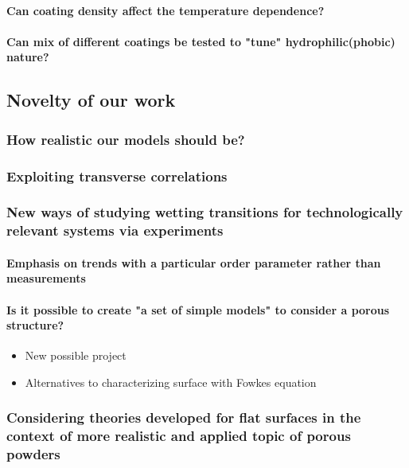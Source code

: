 \documentclass[a4paper,12pt,single,pdftex]{scrartcl}
\begin{document}
{\label{ID_838488932}\paragraph{Can coating density affect the temperature dependence?}

\label{ID_1401479645}\paragraph{Can mix of different coatings be tested to "tune" hydrophilic(phobic) nature?}

\label{ID_1979164963}\subsection{Novelty of our work}

\label{ID_1997632539}\subsubsection{How realistic our models should be?}

\label{ID_625214648}\subsubsection{Exploiting transverse correlations}

\label{ID_1607535616}\subsubsection{New ways of studying wetting transitions for technologically relevant systems via experiments}

\label{ID_825518109}\paragraph{Emphasis on trends with a particular order parameter rather than measurements}

\label{ID_1028951925}\paragraph{Is it possible to create "a set of simple models" to consider a porous structure?}

\begin{itemize}
\label{ID_1602351942}\item New possible project
\label{ID_714004449}\item Alternatives to characterizing surface with Fowkes equation
\end{itemize}
\label{ID_1602351942}\label{ID_714004449}\label{ID_30899692}\subsubsection{Considering theories developed for flat surfaces in the context of more realistic and applied topic of porous powders}

}
\end{document}
